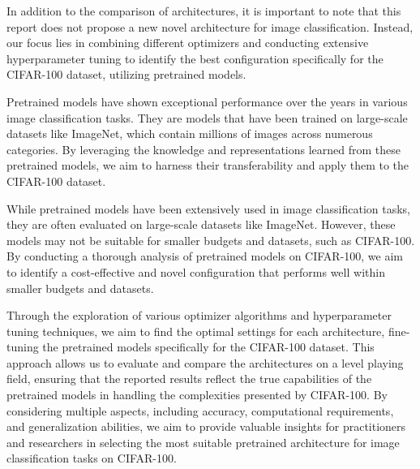 \documentclass{article}
\begin{document}


In addition to the comparison of architectures, it is important to note that this report does not propose a new novel architecture for image classification.
Instead, our focus lies in combining different optimizers and conducting extensive hyperparameter tuning to identify the best configuration specifically for the CIFAR-100 dataset, utilizing pretrained models.

Pretrained models have shown exceptional performance over the years in various image classification tasks. They are models that have been trained on large-scale datasets like ImageNet, which contain millions of images across numerous categories.
By leveraging the knowledge and representations learned from these pretrained models, we aim to harness their transferability and apply them to the CIFAR-100 dataset.



While pretrained models have been extensively used in image classification tasks, they are often evaluated on large-scale datasets like ImageNet. However, these models may not be suitable for smaller budgets and datasets, such as CIFAR-100. By conducting a thorough analysis of pretrained models on CIFAR-100, we aim to identify a cost-effective and novel configuration that performs well within smaller budgets and datasets.


Through the exploration of various optimizer algorithms and hyperparameter tuning techniques, we aim to find the optimal settings for each architecture, fine-tuning the pretrained models specifically for the CIFAR-100 dataset.
This approach allows us to evaluate and compare the architectures on a level playing field, ensuring that the reported results reflect the true capabilities of the pretrained models in handling the complexities presented by CIFAR-100.
By considering multiple aspects, including accuracy, computational requirements, and generalization abilities, we aim to provide valuable insights for practitioners and researchers in selecting the most suitable pretrained architecture for image classification tasks on CIFAR-100.
\end{document}

